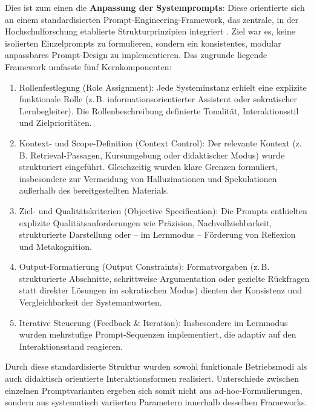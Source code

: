 Dies ist zum einen die \textbf{Anpassung der Systemprompts}: Diese orientierte sich an einem standardisierten Prompt-Engineering-Framework, das zentrale, in der Hochschulforschung etablierte Strukturprinzipien integriert \cite{Lee2025PromptEngineering}. Ziel war es, keine isolierten Einzelprompts zu formulieren, sondern ein konsistentes, modular anpassbares Prompt-Design zu implementieren. Das zugrunde liegende Framework umfasste fünf Kernkomponenten:

\begin{enumerate}
    \item Rollenfestlegung (Role Assignment): 
    Jede Systeminstanz erhielt eine explizite funktionale Rolle (z.\,B. informationsorientierter Assistent oder sokratischer Lernbegleiter). Die Rollenbeschreibung definierte Tonalität, Interaktionsstil und Zielprioritäten.
    
    \item Kontext- und Scope-Definition (Context Control): 
    Der relevante Kontext (z.\,B. Retrieval-Passagen, Kursumgebung oder didaktischer Modus) wurde strukturiert eingeführt. Gleichzeitig wurden klare Grenzen formuliert, insbesondere zur Vermeidung von Halluzinationen und Spekulationen außerhalb des bereitgestellten Materials.
    
    \item Ziel- und Qualitätskriterien (Objective Specification): 
    Die Prompts enthielten explizite Qualitätsanforderungen wie Präzision, Nachvollziehbarkeit, strukturierte Darstellung oder – im Lernmodus – Förderung von Reflexion und Metakognition.
    
    \item Output-Formatierung (Output Constraints): 
    Formatvorgaben (z.\,B. strukturierte Abschnitte, schrittweise Argumentation oder gezielte Rückfragen statt direkter Lösungen im sokratischen Modus) dienten der Konsistenz und Vergleichbarkeit der Systemantworten.
    
    \item Iterative Steuerung (Feedback \& Iteration):
    Insbesondere im Lernmodus wurden mehrstufige Prompt-Sequenzen implementiert, die adaptiv auf den Interaktionsstand reagieren.
\end{enumerate}
Durch diese standardisierte Struktur wurden sowohl funktionale Betriebsmodi als auch didaktisch orientierte Interaktionsformen realisiert. Unterschiede zwischen einzelnen Promptvarianten ergeben sich somit nicht aus ad-hoc-Formulierungen, sondern aus systematisch variierten Parametern innerhalb desselben Frameworks.

